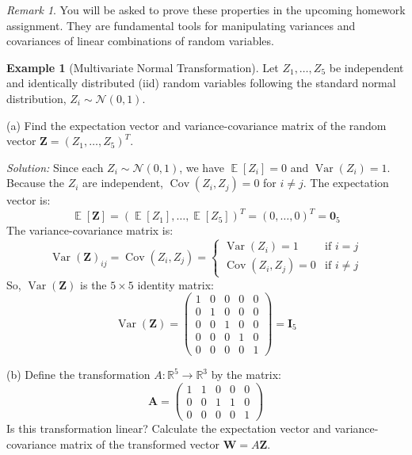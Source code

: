 \documentclass[11pt]{article}
\theoremstyle{definition}
\newtheorem{example}[theorem]{Example}
\theoremstyle{remark}
\newtheorem{remark}[theorem]{Remark}
\DeclareMathOperator{\E}{\mathbb{E}}
\DeclareMathOperator{\Var}{\operatorname{Var}}
\DeclareMathOperator{\Cov}{\operatorname{Cov}}
\begin{document}
\begin{remark}
    You will be asked to prove these properties in the upcoming homework assignment. They are fundamental tools for manipulating variances and covariances of linear combinations of random variables.
\end{remark}

\begin{example}[Multivariate Normal Transformation] \label{ex:mvn_transform}
    Let $Z_1, \ldots, Z_5$ be independent and identically distributed (iid) random variables following the standard normal distribution, $Z_i \sim \mathcal{N}(0, 1)$.
    
    (a) Find the expectation vector and variance-covariance matrix of the random vector $\bm{Z} = (Z_1, \ldots, Z_5)^T$.
    
    \emph{Solution:}
    Since each $Z_i \sim \mathcal{N}(0, 1)$, we have $\E[Z_i] = 0$ and $\Var(Z_i) = 1$. Because the $Z_i$ are independent, $\Cov(Z_i, Z_j) = 0$ for $i \ne j$.
    The expectation vector is:
    \[ \E[\bm{Z}] = (\E[Z_1], \ldots, \E[Z_5])^T = (0, \ldots, 0)^T = \mathbf{0}_5 \]
    The variance-covariance matrix is:
    \[ \Var(\bm{Z})_{ij} = \Cov(Z_i, Z_j) = \begin{cases} \Var(Z_i) = 1 & \text{if } i=j \\ \Cov(Z_i, Z_j) = 0 & \text{if } i \ne j \end{cases} \]
    So, $\Var(\bm{Z})$ is the $5 \times 5$ identity matrix:
    \[ \Var(\bm{Z}) = \begin{pmatrix} 1 & 0 & 0 & 0 & 0 \\ 0 & 1 & 0 & 0 & 0 \\ 0 & 0 & 1 & 0 & 0 \\ 0 & 0 & 0 & 1 & 0 \\ 0 & 0 & 0 & 0 & 1 \end{pmatrix} = \bm{I}_5 \]
    
    (b) Define the transformation $A: \mathbb{R}^5 \to \mathbb{R}^3$ by the matrix:
    \[ \bm{A} = \begin{pmatrix} 1 & 1 & 0 & 0 & 0 \\ 0 & 0 & 1 & 1 & 0 \\ 0 & 0 & 0 & 0 & 1 \end{pmatrix} \]
    Is this transformation linear? Calculate the expectation vector and variance-covariance matrix of the transformed vector $\bm{W} = A\bm{Z}$.
    

\end{example}
\end{document}

